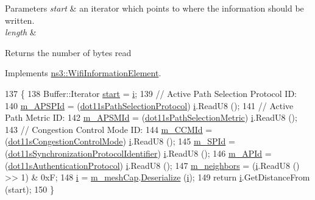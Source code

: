 \begin{DoxyParams}{Parameters}
{\em start} & an iterator which points to where the information should be written. \\
\hline
{\em length} & \\
\hline
\end{DoxyParams}
\begin{DoxyReturn}{Returns}
the number of bytes read 
\end{DoxyReturn}


Implements \hyperlink{classns3_1_1WifiInformationElement_a92135cae0f188d7d8f6c30d9f4becd82}{ns3\+::\+Wifi\+Information\+Element}.


\begin{DoxyCode}
137 \{
138   Buffer::Iterator \hyperlink{namespacevisualizer_1_1core_a2a35e5d8a34af358b508dac8635754e0}{start} = \hyperlink{bernuolliDistribution_8m_a6f6ccfcf58b31cb6412107d9d5281426}{i};
139   \textcolor{comment}{// Active Path Selection Protocol ID:}
140   \hyperlink{classns3_1_1dot11s_1_1IeConfiguration_a95489a45a3fc74d3b8aeffc00fb984a5}{m\_APSPId} = (\hyperlink{namespacens3_1_1dot11s_a0d1bf7753c746323a05091844fc055f9}{dot11sPathSelectionProtocol}) \hyperlink{bernuolliDistribution_8m_a6f6ccfcf58b31cb6412107d9d5281426}{i}.ReadU8 ();
141   \textcolor{comment}{// Active Path Metric ID:}
142   \hyperlink{classns3_1_1dot11s_1_1IeConfiguration_a66dad2c023fede11700bd82df7e84c63}{m\_APSMId} = (\hyperlink{namespacens3_1_1dot11s_add870a70d1c8eef99d450ca9e0c51323}{dot11sPathSelectionMetric}) \hyperlink{bernuolliDistribution_8m_a6f6ccfcf58b31cb6412107d9d5281426}{i}.ReadU8 ();
143   \textcolor{comment}{// Congestion Control Mode ID:}
144   \hyperlink{classns3_1_1dot11s_1_1IeConfiguration_a94af1b13a000077ca39a9d56c5475f67}{m\_CCMId} = (\hyperlink{namespacens3_1_1dot11s_ad20738249c71cb28b1ef0acad0ceca0a}{dot11sCongestionControlMode}) \hyperlink{bernuolliDistribution_8m_a6f6ccfcf58b31cb6412107d9d5281426}{i}.ReadU8 ();
145   \hyperlink{classns3_1_1dot11s_1_1IeConfiguration_acfce7f7c1ee695aa2678f6085d182304}{m\_SPId} = (\hyperlink{namespacens3_1_1dot11s_a31fab993af76c062ff93945bdcb3f599}{dot11sSynchronizationProtocolIdentifier}) 
      \hyperlink{bernuolliDistribution_8m_a6f6ccfcf58b31cb6412107d9d5281426}{i}.ReadU8 ();
146   \hyperlink{classns3_1_1dot11s_1_1IeConfiguration_a203084e324e20b8e82e4f9628f247e72}{m\_APId} = (\hyperlink{namespacens3_1_1dot11s_abdbcad7f88fa5bc91accac0865e18f25}{dot11sAuthenticationProtocol}) \hyperlink{bernuolliDistribution_8m_a6f6ccfcf58b31cb6412107d9d5281426}{i}.ReadU8 ();
147   \hyperlink{classns3_1_1dot11s_1_1IeConfiguration_abc1ef247c86ee7edba5f08305aee8264}{m\_neighbors} = (\hyperlink{bernuolliDistribution_8m_a6f6ccfcf58b31cb6412107d9d5281426}{i}.ReadU8 () >> 1) & 0xF;
148   \hyperlink{bernuolliDistribution_8m_a6f6ccfcf58b31cb6412107d9d5281426}{i} = \hyperlink{classns3_1_1dot11s_1_1IeConfiguration_a1f225db31ce052cb7a9b880651a1f2ea}{m\_meshCap}.\hyperlink{classns3_1_1dot11s_1_1Dot11sMeshCapability_ae384fc4d77bb7dbd00977fbfb3d8b9ec}{Deserialize} (\hyperlink{bernuolliDistribution_8m_a6f6ccfcf58b31cb6412107d9d5281426}{i});
149   \textcolor{keywordflow}{return} \hyperlink{bernuolliDistribution_8m_a6f6ccfcf58b31cb6412107d9d5281426}{i}.GetDistanceFrom (start);
150 \}
\end{DoxyCode}


